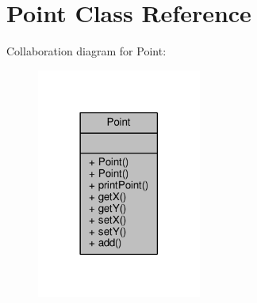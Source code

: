 \hypertarget{classPoint}{}\section{Point Class Reference}
\label{classPoint}


Collaboration diagram for Point\+:
\nopagebreak
\begin{figure}[H]
\begin{center}
\leavevmode
\includegraphics[width=153pt]{classPoint__coll__graph}
\end{center}
\end{figure}
